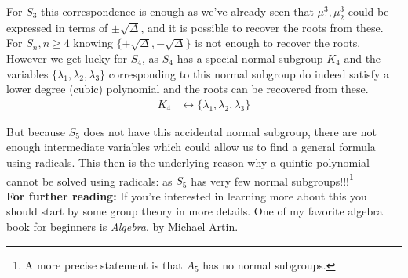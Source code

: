 For $ S_3$ this correspondence is enough as we've already seen that $ \mu_1^3, \mu_2^3$ could be expressed in terms of $ \pm \sqrt{\Delta} $, and it is possible to recover the roots from these.\\

For $ S_n, n \ge 4$ knowing $ \{ +\sqrt{\Delta}, -\sqrt{\Delta} \} $ is not enough to recover the roots.\\

However we get lucky for $ S_4$, as $ S_4$ has a special normal subgroup $ K_4$ and the variables $ \{ \lambda_1, \lambda_2, \lambda_3 \}$ corresponding to this normal subgroup do indeed satisfy a lower degree (cubic) polynomial and the roots can be recovered from these.
\begin{align*}
  K_4 & \leftrightarrow \{ \lambda_1, \lambda_2, \lambda_3 \}
\end{align*}

But because $ S_5$ does not have this accidental normal subgroup, there are not enough intermediate variables which could allow us to find a general formula using radicals. This then is the underlying reason why a quintic polynomial cannot be solved using radicals: as $ S_5$ has very few normal subgroups!!!\footnote{A more precise statement is that $ A_5$ has no normal subgroups.}\\

\noindent \textbf{For further reading:} If you're interested in learning more about this you should start by some group theory in more details. One of my favorite algebra book for beginners is \emph{Algebra}, by Michael Artin.

